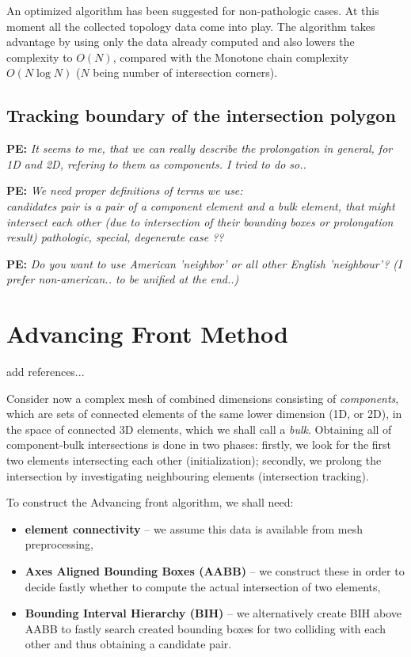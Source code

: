 \documentclass{elsarticle}
\newcommand{\notePE}[1]{{\color{Orange} \textbf{PE: } \textit{#1}}}
\begin{document}
An optimized algorithm has been suggested for non-pathologic cases. At this moment all the collected topology 
data come into play. The algorithm takes advantage by using only the data already computed and also lowers
the complexity to $O(N)$, compared with the Monotone chain complexity $O(N\log N)$ 
($N$ being number of intersection corners).


\subsection{Tracking boundary of the intersection polygon}

\notePE{It seems to me, that we can really describe the prolongation in general, for 1D and 2D, 
refering to them as components. I tried to do so..}

\notePE{We need proper definitions of terms we use: \\
\emph{candidates pair}  is a pair of a component element and a bulk element, that might intersect
each other (due to intersection of their bounding boxes or prolongation result)
\emph{pathologic, special, degenerate case ??}
}

\notePE{Do you want to use American 'neighbor' or all other English 'neighbour'? (I prefer non-american.. to be unified at the end..)}


\section{Advancing Front Method}

add references...

Consider now a complex mesh of combined dimensions consisting of \emph{components}, which are sets of connected
elements of the same lower dimension (1D, or 2D), in the space of connected 3D elements, which we shall call a \emph{bulk}. 
Obtaining all of component-bulk intersections is done in two phases: firstly, we look for the first two elements intersecting each other (initialization); secondly, we prolong the intersection by investigating neighbouring elements (intersection tracking).

To construct the Advancing front algorithm, we shall need:
\begin{itemize}
    \item \textbf{element connectivity} -- we assume this data is available from mesh preprocessing,
    \item \textbf{Axes Aligned Bounding Boxes (AABB)} -- we construct these in order to decide fastly
                    whether to compute the actual intersection of two elements,
    \item \textbf{Bounding Interval Hierarchy (BIH)} -- we alternatively create BIH above AABB to fastly search 
                    created bounding boxes for two colliding with each other and thus obtaining a candidate pair.
\end{itemize}
\end{document}

